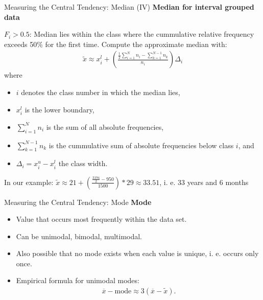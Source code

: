 \begin{frame}{Measuring the Central Tendency: Median (IV)}
  \textbf{Median for interval grouped data}

  $F_i>0.5$: Median lies within the class where the cummulative
  relative frequency exceeds 50\% for the first time. Compute the approximate median with:
  \begin{align*}
    \tilde{x} \approx x_i^l +\left(\frac{\frac{1}{2}\sum_{i=1}^{N}n_i - \sum_{k=1}^{N-1} n_k}{n_i}\right)\Delta_i
  \end{align*}
  where
  \begin{itemize}
  \item $i$ denotes the class number in which the median lies,
  \item $x_i^l$ is the lower boundary,
  \item $\sum_{i=1}^{N}n_i$ is the sum of all absolute frequencies,
  \item $\sum_{k=1}^{N-1} n_k$ is the cummulative sum of absolute frequencies below class $i$, and
  \item $\Delta_i=x_i^u - x_i^l$ the class width.
  \end{itemize}

  In our example: $\tilde{x} \approx 21 +\left(\frac{\frac{3194}{2} - 950}{1500}\right)*29 \approx 33.51$, i. e. 33 years and 6 months
\end{frame}



\begin{frame}{Measuring the Central Tendency: Mode}
  \textbf{Mode}
  \begin{itemize}[noitemsep]
  \item Value that occurs most frequently within the data set.
  \item Can be unimodal, bimodal, multimodal.
  \item Also possible that no mode exists when each value is unique,
    i. e. occurs only once.
  \item Empirical formula for unimodal modes:
    \begin{align}
      \overline{x} - \text{mode} \approx 3(\overline{x}- \tilde{x}).
    \end{align}
  \end{itemize}
\end{frame}

